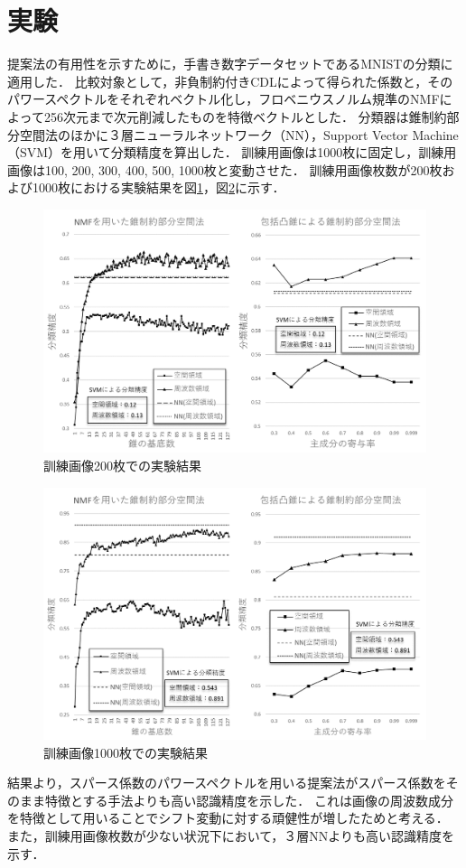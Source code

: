 \documentclass[9pt,a4paper,twocolumn,uplatex]{jsarticle}
\begin{document}
\section{実験}
提案法の有用性を示すために，手書き数字データセットであるMNISTの分類に適用した．
比較対象として，非負制約付きCDLによって得られた係数と，そのパワースペクトルをそれぞれベクトル化し，フロベニウスノルム規準のNMFによって256次元まで次元削減したものを特徴ベクトルとした．
分類器は錐制約部分空間法のほかに３層ニューラルネットワーク（NN），Support Vector Machine（SVM）を用いて分類精度を算出した．
訓練用画像は1000枚に固定し，訓練用画像は100, 200, 300, 400, 500, 1000枚と変動させた．
訓練用画像枚数が200枚および1000枚における実験結果を図\ref{fig:result-200}，図\ref{fig:result-1000}に示す．
\begin{figure}[htb]
	\centering
	\includegraphics[width=\linewidth]{result-200}
	\caption{訓練画像200枚での実験結果}
	\label{fig:result-200}
\end{figure}
\begin{figure}[htb]
	\centering
	\includegraphics[width=\linewidth]{result-1000}
	\caption{訓練画像1000枚での実験結果}
	\label{fig:result-1000}
\end{figure}
結果より，スパース係数のパワースペクトルを用いる提案法がスパース係数をそのまま特徴とする手法よりも高い認識精度を示した．
これは画像の周波数成分を特徴として用いることでシフト変動に対する頑健性が増したためと考える．
また，訓練用画像枚数が少ない状況下において，３層NNよりも高い認識精度を示す．
\end{document}
